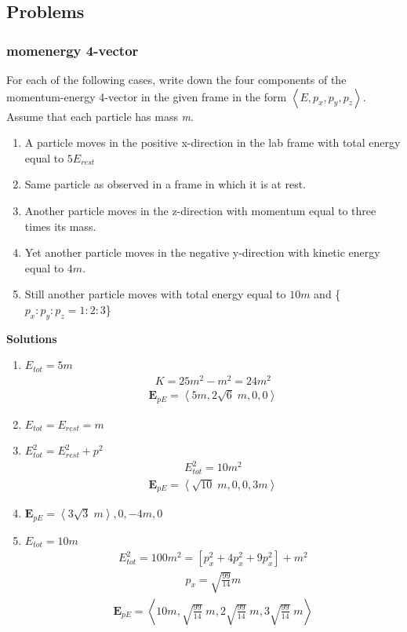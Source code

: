 \documentclass[11pt,letterpaper]{book}
\newcommand{\sqbkt}[1]{\left[ #1 \right]}
\newcommand{\tribkt}[1]{\left< #1 \right>}
\begin{document}
\subsection{Problems}
\subsubsection{momenergy 4-vector}
For each of the following cases, write down the four components of the momentum-energy 4-vector in the given frame in the form $\tribkt{E,p_x,p_y,p_z}$. Assume that each particle has mass \textit{m}. 
\begin{enumerate}
    \item A particle moves in the positive x-direction in the lab frame with total energy equal to $5E_{rest}$
    \item Same particle as observed in a frame in which it is at rest.
    \item Another particle moves in the z-direction with momentum equal to three times its mass.
    \item Yet another particle moves in the negative y-direction with kinetic energy equal to $4m$.
    \item Still another particle moves with total energy equal to $10m$ and \{$p_x:p_y:p_z = 1:2:3$\}
\end{enumerate}
\textbf{Solutions}
\begin{enumerate}
    \item \(E_{tot}=5m\)
    \begin{align}
    K = 25m^2 - m^2 = 24m^2
    \end{align}
    \begin{align}
    \textbf{E}_{pE} = \tribkt{5m,2\sqrt{6}\;m,0,0}
    \end{align}
    \item \( E_{tot} = E_{rest} = m\)
    \item \(E_{tot}^2 = E_{rest}^2 + p^2\)
    \begin{align}
    E_{tot}^2 = 10m^2
    \end{align}
    \begin{align}
    \textbf{E}_{pE} = \tribkt{\sqrt{10}\; m, 0,0,3m}
    \end{align}
    \item \( \textbf{E}_{pE} = \tribkt{3\sqrt{3}\; m},0,-4m,0\)
    \item \(E_{tot} = 10m\)
    \begin{align}
    E_{tot}^2 = 100m^2 = \sqbkt{p_x^2+4p_x^2+9p_x^2}+m^2
    \end{align}
    \begin{align}
    p_x = \sqrt{\frac{99}{14}}m
    \end{align}
    \begin{align}
    \textbf{E}_{pE} = \tribkt{10m,\sqrt{\frac{99}{14}}\;m,2\sqrt{\frac{99}{14}}\;m,3\sqrt{\frac{99}{14}}\;m}
    \end{align}

\end{enumerate}
\end{document}
